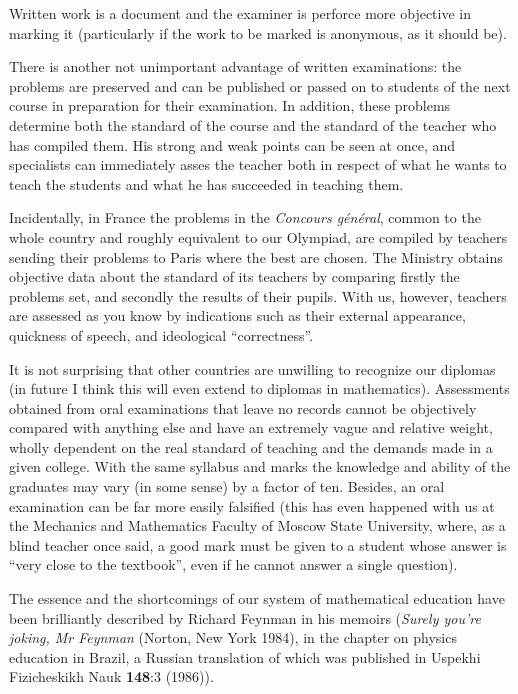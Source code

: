 \documentclass{article}
\begin{document}
Written work is a document and the examiner is perforce more objective in
marking it (particularly if the work to be marked is anonymous, as it should
be).

There is another not unimportant advantage of written examinations: the problems
are preserved and can be published or passed on to students of the next course
in preparation for their examination. In addition, these problems determine both
the standard of the course and the standard of the teacher who has compiled
them. His strong and weak points can be seen at once, and specialists can
immediately asses the teacher both in respect of what he wants to teach the
students and what he has succeeded in teaching them.

Incidentally, in France the problems in the \emph{Concours g\'en\'eral}, common
to the whole country and roughly equivalent to our Olympiad, are compiled by
teachers sending their problems to Paris where the best are chosen. The Ministry
obtains objective data about the standard of its teachers by comparing firstly
the problems set, and secondly the results of their pupils. With us, however,
teachers are assessed as you know by indications such as their external
appearance, quickness of speech, and ideological ``correctness''.

It is not surprising that other countries are unwilling to recognize our
diplomas (in future I think this will even extend to diplomas in mathematics).
Assessments obtained from oral examinations that leave no records cannot be
objectively compared with anything else and have an extremely vague and relative
weight, wholly dependent on the real standard of teaching and the demands made
in a given college. With the same syllabus and marks the knowledge and ability
of the graduates may vary (in some sense) by a factor of ten. Besides, an oral
examination can be far more easily falsified (this has even happened with us at
the Mechanics and Mathematics Faculty of Moscow State University, where, as a
blind teacher once said, a good mark must be given to a student whose answer is
``very close to the textbook'', even if he cannot answer a single question).

The essence and the shortcomings of our system of mathematical education have
been brilliantly described by Richard Feynman in his memoirs (\emph{Surely
  you're joking, Mr Feynman} (Norton, New York 1984), in the chapter on physics
education in Brazil, a Russian translation of which was published in Uspekhi
Fizicheskikh Nauk \textbf{148}:3 (1986)).
\end{document}
